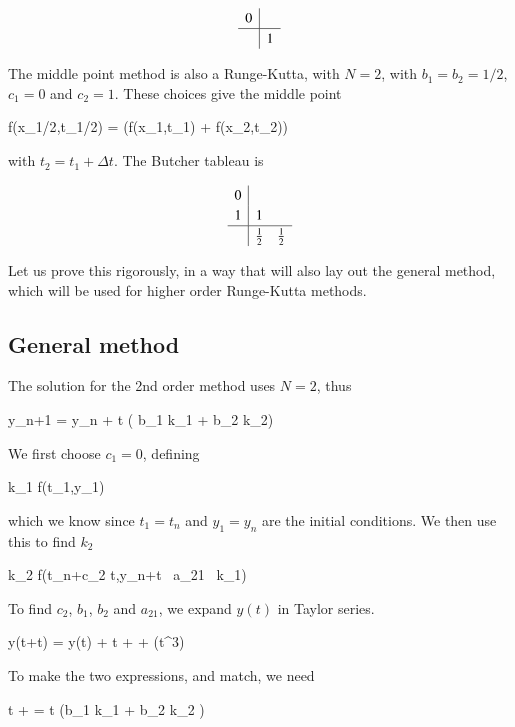 \[
    \renewcommand\arraystretch{1.2}
\begin{array}
{c|c}
0 &  \\
\hline
  & 1
\end{array}
\]


The middle point method is also a Runge-Kutta, with $N=2$, with $b_1 = b_2 =
1/2$, $c_1 = 0$ and $c_2 = 1$. These choices give the middle point

\beq
f(x_{1/2},t_{1/2}) = \left(f(x_1,t_1) + f(x_2,t_2)\right)
\eeq

with $t_2 = t_1 + \Delta t$. The Butcher tableau is

\[
  \renewcommand\arraystretch{1.2}
  \begin{array}
{c|ccccc}
0\\
1& 1\\
\hline
  & \frac{1}{2} &\frac{1}{2}
\end{array}
\]

Let us prove this rigorously, in a way that will also lay out the
general method, which will be used for higher order Runge-Kutta
methods. 

\subsection{General method}

The solution for the 2nd order method uses $N=2$, thus

\beq
y_{n+1} = y_n + \Delta t  \left( b_1 k_1 + b_2 k_2\right)
\label{eq:expand2}
\eeq

We first choose $c_1 = 0$, defining

\beq
k_1 \equiv f(t_1,y_1) 
\eeq

\noindent which we know since $t_1=t_n$ and $y_1=y_n$ are the initial conditions. We then use this to find $k_2$

\beq
k_2 \equiv f(t_n+c_2 \Delta t,y_n+\Delta t \ a_{21} \ k_1) 
\eeq


\noindent To find $c_2$, $b_1$, $b_2$ and $a_{21}$, we expand $y(t)$ in Taylor series.

\beq
y(t+\Delta t) = y(t) + \Delta t +
 +
(\Delta t^3) 
\label{eq:taylor}
\eeq

To make the two expressions,  and  match, we need

\beq
{}\Delta t +  = \Delta t \left(b_1 k_1 + b_2 k_2 \right)
\eeq

